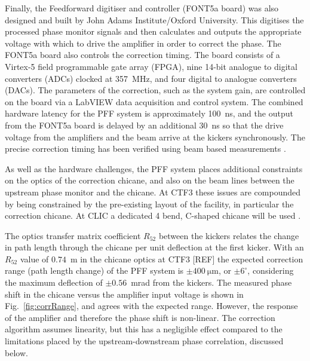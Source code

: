 \documentclass[%
 reprint,
superscriptaddress,
 amsmath,amssymb,
 prl,
]{revtex4-1}
\begin{document}
Finally, the Feedforward digitiser and controller (FONT5a board) 
\cite{RobertsThesis} was also 
designed and built by John Adams Institute/Oxford University. This digitises 
the processed phase monitor signals and then calculates and outputs the 
appropriate voltage with which to drive the amplifier in order to correct the 
phase. The FONT5a board also controls the correction 
timing. The board consists of a Virtex-5 field programmable gate array (FPGA), 
nine 14-bit analogue to digital converters (ADCs) clocked at 357~MHz, and four 
digital to analogue converters (DACs). The parameters of the correction, such 
as the system gain, are controlled on the board via a LabVIEW data 
acquisition and control system. The combined hardware latency for the PFF 
system is approximately 
100~ns, and the output from the FONT5a board is delayed by an additional 30~ns 
so that the drive voltage from the amplifiers and the beam arrive at the 
kickers synchronously. The precise correction timing has been verified using 
beam based measurements \cite{RobertsThesis}.%


As well as the hardware challenges, the PFF system places additional 
constraints on the optics of the correction 
chicane, and also on the beam lines between the upstream phase monitor and the 
chicane. At CTF3 these issues are compounded by being constrained by the 
pre-existing layout of the facility, in particular the correction chicane. At 
CLIC a dedicated 4 bend, C-shaped chicane will be used \cite{CLICCDR}.

The optics transfer matrix coefficient \(R_{52}\) between the kickers relates 
the change in path length through the chicane per unit 
deflection at the first kicker. 
With an \(R_{52}\) value of \(0.74\)~m in the chicane optics at 
CTF3 [REF] the expected correction range (path length change) of the PFF system 
is \(\pm400~\mathrm{\mu m}\), or \(\pm6^\circ\), considering the maximum 
deflection of \(\pm0.56\)~mrad from the kickers.
The measured phase shift in the chicane versus the amplifier input voltage is 
shown in Fig.~\ref{fig:corrRange}, and agrees with the expected range. 
However, the response of the amplifier and therefore the phase shift is 
non-linear. The correction algorithm assumes linearity, but this has a 
negligible effect compared to the limitations placed by the
upstream-downstream phase correlation, discussed below.
\end{document}
